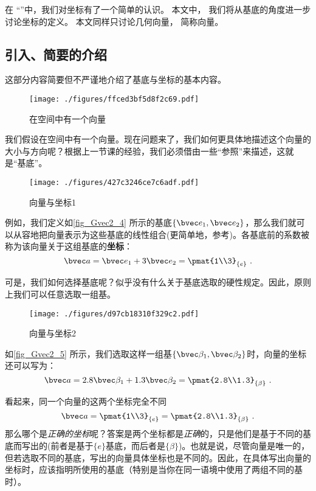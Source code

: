 


在 “”中，我们对坐标有了一个简单的认识。 本文中， 我们将从基底的角度进一步讨论坐标的定义。 本文同样只讨论几何向量， 简称向量。

\subsection{引入、简要的介绍}
这部分内容简要但不严谨地介绍了基底与坐标的基本内容。
\begin{figure}[ht]
\centering
\texttt{[image: ./figures/ffced3bf5d8f2c69.pdf]}
\caption{在空间中有一个向量} \label{fig_Gvec2_3}
\end{figure}

我们假设在空间中有一个向量。现在问题来了，我们如何更具体地描述这个向量的大小与方向呢？根据上一节课的经验，我们必须借由一些“参照”来描述，这就是“基底”。

\begin{figure}[ht]
\centering
\texttt{[image: ./figures/427c3246ce7c6adf.pdf]}
\caption{向量与坐标1} \label{fig_Gvec2_4}
\end{figure}
例如，我们定义如\autoref{fig_Gvec2_4} 所示的基底$\{\bvec e_1,\bvec e_2\}$，那么我们就可以从容地把向量表示为这些基底的线性组合(更简单地，参考)。各基底前的系数被称为该向量关于这组基底的\textbf{坐标}：
$$\bvec a = \bvec e_1 + 3\bvec e_2=
\pmat{1\\3}_{\{e\}}~.$$

可是，我们如何选择基底呢？似乎没有什么关于基底选取的硬性规定。因此，原则上我们可以任意选取一组基。
\begin{figure}[ht]
\centering
\texttt{[image: ./figures/d97cb18310f329c2.pdf]}
\caption{向量与坐标2} \label{fig_Gvec2_5}
\end{figure}
如\autoref{fig_Gvec2_5} 所示，我们选取这样一组基$\{\bvec \beta_1,\bvec \beta_2\}$时，向量的坐标还可以写为：
$$\bvec a = 2.8 \bvec \beta_1 + 1.3 \bvec \beta_2=
\pmat{2.8\\1.3}_{\{\beta\}}~.$$

看起来，同一个向量的这两个坐标完全不同
$$\bvec a = \pmat{1\\3}_{\{e\}} =
\pmat{2.8\\1.3}_{\{\beta\}}~.$$
那么哪个是\textsl{正确的坐标}呢？答案是两个坐标都是\textsl{正确}的，只是他们是基于不同的基底而写出的(前者是基于$\{e\}$基底，而后者是$\{\beta\}$)。也就是说，尽管向量是唯一的，但若选取不同的基底，写出的向量具体坐标也是不同的。因此，在具体写出向量的坐标时，应该指明所使用的基底（特别是当你在同一语境中使用了两组不同的基时）。

